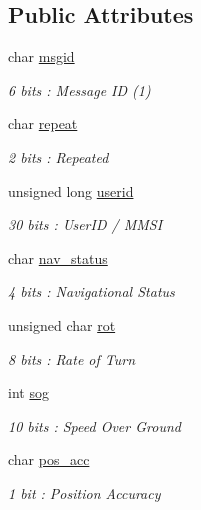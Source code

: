\subsection*{Public Attributes}
\begin{DoxyCompactItemize}
\item 
char \mbox{\hyperlink{structaismsg__1_a8e7ddbbc35c32853cca74b618a71705e}{msgid}}
\begin{DoxyCompactList}\small\item\em 6 bits \+: Message ID (1) \end{DoxyCompactList}\item 
char \mbox{\hyperlink{structaismsg__1_aaf1cf4bd7b789788e6e906877d88b61b}{repeat}}
\begin{DoxyCompactList}\small\item\em 2 bits \+: Repeated \end{DoxyCompactList}\item 
unsigned long \mbox{\hyperlink{structaismsg__1_a896ad74aef1c82a466b820f678783b60}{userid}}
\begin{DoxyCompactList}\small\item\em 30 bits \+: User\+ID / M\+M\+SI \end{DoxyCompactList}\item 
char \mbox{\hyperlink{structaismsg__1_a51fc1939072a7a6381d928455bec038d}{nav\+\_\+status}}
\begin{DoxyCompactList}\small\item\em 4 bits \+: Navigational Status \end{DoxyCompactList}\item 
unsigned char \mbox{\hyperlink{structaismsg__1_a34c51d7cc9731a67abaaae00d5623618}{rot}}
\begin{DoxyCompactList}\small\item\em 8 bits \+: Rate of Turn \end{DoxyCompactList}\item 
int \mbox{\hyperlink{structaismsg__1_accf54407c326f0d1d28e047243c1b15e}{sog}}
\begin{DoxyCompactList}\small\item\em 10 bits \+: Speed Over Ground \end{DoxyCompactList}\item 
char \mbox{\hyperlink{structaismsg__1_a4dbea8cf64bf59ba8633ad07931c340a}{pos\+\_\+acc}}
\begin{DoxyCompactList}\small\item\em 1 bit \+: Position Accuracy \end{DoxyCompactList}\item 

\end{DoxyCompactItemize}
